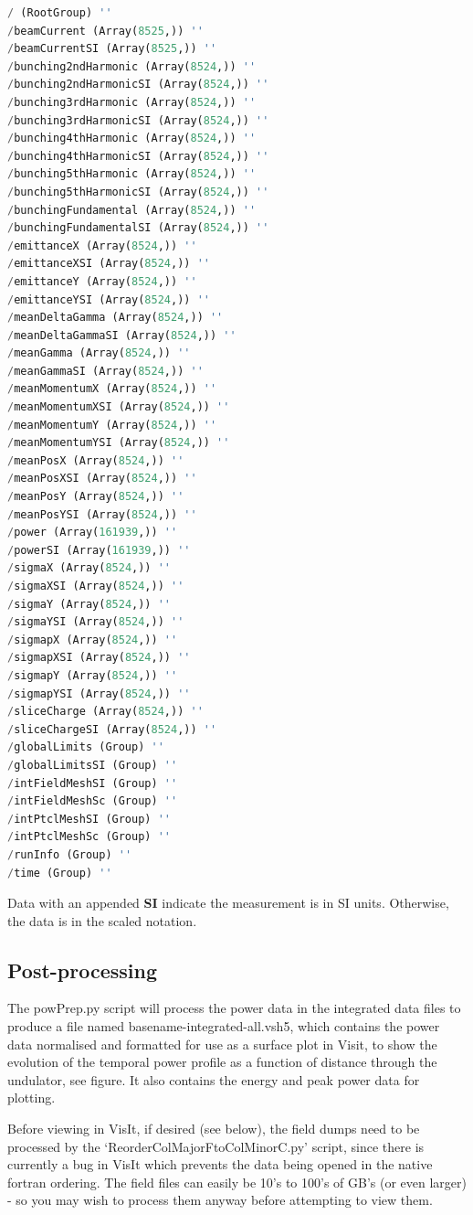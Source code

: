 \documentclass[12pt]{article}%
\begin{document}
\begin{lstlisting}[language=python]
/ (RootGroup) ''
/beamCurrent (Array(8525,)) ''
/beamCurrentSI (Array(8525,)) ''
/bunching2ndHarmonic (Array(8524,)) ''
/bunching2ndHarmonicSI (Array(8524,)) ''
/bunching3rdHarmonic (Array(8524,)) ''
/bunching3rdHarmonicSI (Array(8524,)) ''
/bunching4thHarmonic (Array(8524,)) ''
/bunching4thHarmonicSI (Array(8524,)) ''
/bunching5thHarmonic (Array(8524,)) ''
/bunching5thHarmonicSI (Array(8524,)) ''
/bunchingFundamental (Array(8524,)) ''
/bunchingFundamentalSI (Array(8524,)) ''
/emittanceX (Array(8524,)) ''
/emittanceXSI (Array(8524,)) ''
/emittanceY (Array(8524,)) ''
/emittanceYSI (Array(8524,)) ''
/meanDeltaGamma (Array(8524,)) ''
/meanDeltaGammaSI (Array(8524,)) ''
/meanGamma (Array(8524,)) ''
/meanGammaSI (Array(8524,)) ''
/meanMomentumX (Array(8524,)) ''
/meanMomentumXSI (Array(8524,)) ''
/meanMomentumY (Array(8524,)) ''
/meanMomentumYSI (Array(8524,)) ''
/meanPosX (Array(8524,)) ''
/meanPosXSI (Array(8524,)) ''
/meanPosY (Array(8524,)) ''
/meanPosYSI (Array(8524,)) ''
/power (Array(161939,)) ''
/powerSI (Array(161939,)) ''
/sigmaX (Array(8524,)) ''
/sigmaXSI (Array(8524,)) ''
/sigmaY (Array(8524,)) ''
/sigmaYSI (Array(8524,)) ''
/sigmapX (Array(8524,)) ''
/sigmapXSI (Array(8524,)) ''
/sigmapY (Array(8524,)) ''
/sigmapYSI (Array(8524,)) ''
/sliceCharge (Array(8524,)) ''
/sliceChargeSI (Array(8524,)) ''
/globalLimits (Group) ''
/globalLimitsSI (Group) ''
/intFieldMeshSI (Group) ''
/intFieldMeshSc (Group) ''
/intPtclMeshSI (Group) ''
/intPtclMeshSc (Group) ''
/runInfo (Group) ''
/time (Group) ''
\end{lstlisting}

Data with an appended {\bf SI} indicate the measurement is in SI units. Otherwise, the data is in the scaled notation.

\subsection{Post-processing}

The powPrep.py script will process the power data in the integrated data files to produce a file named basename-integrated-all.vsh5, which contains the power data normalised and formatted for use as a surface plot in Visit, to show the evolution of the temporal power profile as a function of distance through the undulator, see figure. It also contains the energy and peak power data for plotting.

Before viewing in VisIt, if desired (see below), the field dumps need to be processed by the `ReorderColMajorFtoColMinorC.py' script, since there is currently a bug in VisIt which prevents the data being opened in the native fortran ordering. The field files can easily be 10's to 100's of GB's (or even larger) - so you may wish to process them anyway before attempting to view them.
\end{document}
